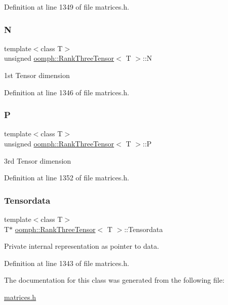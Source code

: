 Definition at line 1349 of file matrices.\+h.

\mbox{\label{classoomph_1_1RankThreeTensor_a2d5b895e2cb3543b16a64159041d52c3}} 
\subsubsection{\texorpdfstring{N}{N}}
{\footnotesize\ttfamily template$<$class T$>$ \\
unsigned \hyperlink{classoomph_1_1RankThreeTensor}{oomph\+::\+Rank\+Three\+Tensor}$<$ T $>$\+::N\hspace{0.3cm}{\ttfamily [private]}}



1st Tensor dimension 



Definition at line 1346 of file matrices.\+h.

\mbox{\label{classoomph_1_1RankThreeTensor_ae93ba8b2baf4f92af533ae66bfcbe570}} 
\subsubsection{\texorpdfstring{P}{P}}
{\footnotesize\ttfamily template$<$class T$>$ \\
unsigned \hyperlink{classoomph_1_1RankThreeTensor}{oomph\+::\+Rank\+Three\+Tensor}$<$ T $>$\+::P\hspace{0.3cm}{\ttfamily [private]}}



3rd Tensor dimension 



Definition at line 1352 of file matrices.\+h.

\mbox{\label{classoomph_1_1RankThreeTensor_aef2671e89361c2260c7d3936fc8860ec}} 
\subsubsection{\texorpdfstring{Tensordata}{Tensordata}}
{\footnotesize\ttfamily template$<$class T$>$ \\
T$\ast$ \hyperlink{classoomph_1_1RankThreeTensor}{oomph\+::\+Rank\+Three\+Tensor}$<$ T $>$\+::Tensordata\hspace{0.3cm}{\ttfamily [private]}}



Private internal representation as pointer to data. 



Definition at line 1343 of file matrices.\+h.



The documentation for this class was generated from the following file\+:\begin{DoxyCompactItemize}
\item 
\hyperlink{matrices_8h}{matrices.\+h}\end{DoxyCompactItemize}
